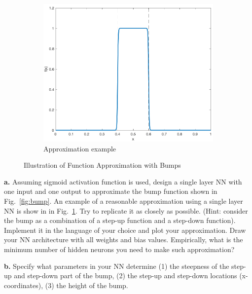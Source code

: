 \documentclass{article}
\begin{document}
\begin{figure}[h!]
\begin{subfigure}{.45\textwidth}
  \includegraphics[width=.99\linewidth]{bump1.png}
  \caption{Approximation example}
  \label{fig:bump1}
\end{subfigure}%
\caption{Illustration of Function Approximation with Bumps}
\label{fig:bump_appro}
\end{figure}

\textbf{a.} Assuming sigmoid activation function is used, design a single layer NN with one input and one output to approximate the bump function shown in Fig.~\ref{fig:bump}. An example of a reasonable approximation using a single layer NN is show in in Fig.~\ref{fig:bump1}. Try to replicate it as closely as possible. (Hint: consider the bump as a combination of a step-up function and a step-down function). Implement it in the language of your choice and plot your approximation. Draw your NN architecture with all weights and bias values. Empirically, what is the minimum number of hidden neurons you need to make such approximation? 

\textbf{b.} Specify what parameters in your NN determine (1) the steepness of the step-up and step-down part of the bump, (2) the step-up and step-down locations (x-coordinates), (3) the height of the bump.
\end{document}
